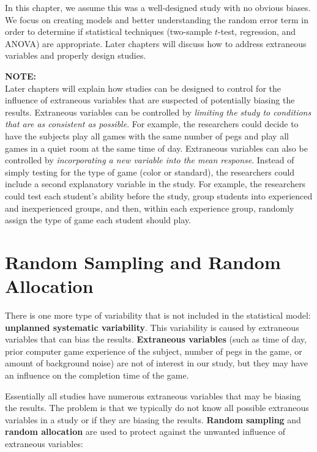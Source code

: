 \documentclass[
]{report}
\begin{document}
In this chapter, we assume this was a well-designed study with no obvious biases. We focus on creating models and better understanding the random error term in order to determine if statistical techniques (two-sample \(t\)-test, regression, and ANOVA) are appropriate. Later chapters will discuss how to address extraneous variables and properly design studies.

\large

\textbf{NOTE:}\\
Later chapters will explain how studies can be designed to control for the influence of extraneous variables that are suspected of potentially biasing the results. Extraneous variables can be controlled by \emph{limiting the study to conditions that are as consistent as possible}. For example, the researchers could decide to have the subjects play all games with the same number of pegs and play all games in a quiet room at the same time of day. Extraneous variables can also be controlled by \emph{incorporating a new variable into the mean response}. Instead of simply testing for the type of game (color or standard), the researchers could include a second explanatory variable in the study. For example, the researchers could test each student's ability before the study, group students into experienced and inexperienced groups, and then, within each experience group, randomly assign the type of game each student should play.
\normalsize

\hypertarget{random-sampling-and-random-allocation}{%
\section{\texorpdfstring{\textbf{Random Sampling and Random Allocation}}{Random Sampling and Random Allocation}}\label{random-sampling-and-random-allocation}}

There is one more type of variability that is not included in the statistical model: \textbf{unplanned systematic variability}. This variability is caused by extraneous variables that can bias the results. \textbf{Extraneous variables} (such as time of day, prior computer game experience of the subject, number of pegs in the game, or amount of background noise) are not of interest in our study, but they may have an influence on the completion time of the game.

Essentially all studies have numerous extraneous variables that may be biasing the results. The problem is that we typically do not know all possible extraneous variables in a study or if they are biasing the results. \textbf{Random sampling} and \textbf{random allocation} are used to protect against the unwanted influence of extraneous variables:
\end{document}
